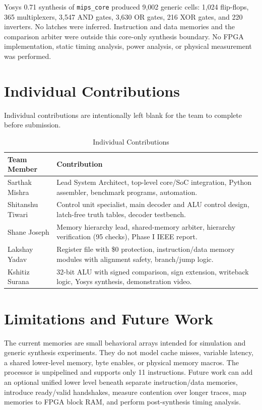 \documentclass[conference]{IEEEtran}
\begin{document}
Yosys 0.71 synthesis of \texttt{mips\_core} produced 9,002 generic cells: 1,024 flip-flops, 365 multiplexers, 3,547 AND gates, 3,630 OR gates, 216 XOR gates, and 220 inverters. No latches were inferred. Instruction and data memories and the comparison arbiter were outside this core-only synthesis boundary. No FPGA implementation, static timing analysis, power analysis, or physical measurement was performed.

\section{Individual Contributions}
Individual contributions are intentionally left blank for the team to complete before submission.

\begin{table}[h]
\centering
\caption{Individual Contributions}
\label{tab:contributions}
\begin{tabular}{@{}lp{}@{}}
\toprule
Team Member & Contribution \\
\midrule
Sarthak Mishra & Lead System Architect, top-level core/SoC integration, Python assembler, benchmark programs, automation. \\
\midrule
Shitanshu Tiwari & Control unit specialist, main decoder and ALU control design, latch-free truth tables, decoder testbench. \\
\midrule
Shane Joseph & Memory hierarchy lead, shared-memory arbiter, hierarchy verification (95 checks), Phase I IEEE report. \\
\midrule
Lakshay Yadav & Register file with \$0 protection, instruction/data memory modules with alignment safety, branch/jump logic. \\
\midrule
Kshitiz Surana & 32-bit ALU with signed comparison, sign extension, writeback logic, Yosys synthesis, demonstration video. \\
\bottomrule
\end{tabular}
\end{table}

\section{Limitations and Future Work}
The current memories are small behavioral arrays intended for simulation and generic synthesis experiments. They do not model cache misses, variable latency, a shared lower-level memory, byte enables, or physical memory macros. The processor is unpipelined and supports only 11 instructions. Future work can add an optional unified lower level beneath separate instruction/data memories, introduce ready/valid handshakes, measure contention over longer traces, map memories to FPGA block RAM, and perform post-synthesis timing analysis.
\end{document}
